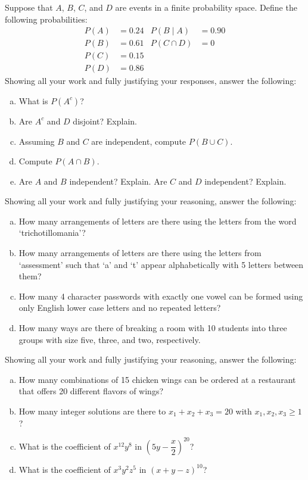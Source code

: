 \documentclass[12pt,letterpaper]{exam}
\begin{document}
\begin{questions}
\newpage
\question[10] Suppose that $A$, $B$, $C$, and $D$ are events in a finite probability space. Define the following probabilities:
	\[
	\begin{aligned}
	P(A)&= 0.24 & P(B \;|\; A)&= 0.90 \\
	P(B)&= 0.61 & P(C \cap D)&= 0 \\
	P(C)&= 0.15 \\
	P(D)&= 0.86
	\end{aligned}
	\]
Showing all your work and fully justifying your responses, answer the following:
	\begin{enumerate}[(a)]
	\item What is $P(A^c)$?
	\item Are $A^c$ and $D$ disjoint? Explain. 
	\item Assuming $B$ and $C$ are independent, compute $P(B \cup C)$.
	\item Compute $P(A \cap B)$.
	\item Are $A$ and $B$ independent? Explain. Are $C$ and $D$ independent? Explain.
	\end{enumerate}



\newpage
\question[10] Showing all your work and fully justifying your reasoning, answer the following:
	\begin{enumerate}[(a)]
	\item How many arrangements of letters are there using the letters from the word `trichotillomania'?
	\item How many arrangements of letters are there using the letters from `assessment' such that `a' and `t' appear alphabetically with 5 letters between them?
	\item How many 4 character passwords with exactly one vowel can be formed using only English lower case letters and no repeated letters?
	\item How many ways are there of breaking a room with 10 students into three groups with size five, three, and two, respectively. 
	\end{enumerate}



\newpage 
\question[10] Showing all your work and fully justifying your reasoning, answer the following:
	\begin{enumerate}[(a)]
	\item How many combinations of 15 chicken wings can be ordered at a restaurant that offers 20 different flavors of wings? 
	\item How many integer solutions are there to $x_1 + x_2 + x_3= 20$ with $x_1, x_2, x_3 \geq 1$?
	\item What is the coefficient of $x^{12} y^8$ in $\left( 5y - \dfrac{x}{2} \right)^{20}$?
	\item What is the coefficient of $x^3 y^2 z^5$ in $(x + y - z)^{10}$?
	\end{enumerate}




\end{questions}
\end{document}
